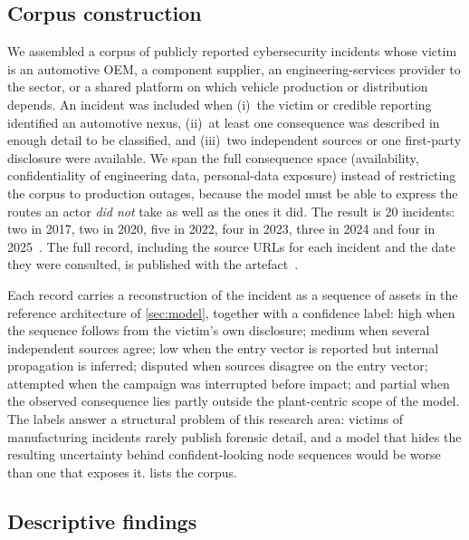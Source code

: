 \subsection{Corpus construction}

We assembled a corpus of publicly reported cybersecurity incidents whose victim
is an automotive OEM, a component supplier, an engineering-services provider to
the sector, or a shared platform on which vehicle production or distribution
depends. An incident was included when (i)~the victim or credible reporting
identified an automotive nexus, (ii)~at least one consequence was described in
enough detail to be classified, and (iii)~two independent sources or one
first-party disclosure were available. We span the full consequence
space (availability, confidentiality of engineering data, personal-data
exposure) instead of restricting the corpus to production outages, because the model must be able to express the routes an actor
\emph{did not} take as well as the ones it did. The result is 20 incidents:
two in 2017, two in 2020, five in 2022, four in 2023, three in 2024 and four in
2025~\cite{inc01renault,inc01nbc,inc03honda,inc04toyota,inc04infosec,inc05denso,%
inc06bridgestone,inc07continental,inc08tesla,inc09toyotacloud,inc10vw,inc11cdk,%
inc14yanfeng,inc17stellantis,inc18cmc,inc18cw,inc19toyotagithub,inc20mks}. The
full record, including the source URLs for each incident and the date they were
consulted, is published with the artefact~\cite{capmartifact}.

Each record carries a reconstruction of the incident as a sequence of assets in
the reference architecture of \cref{sec:model}, together with a confidence
label: \textsf{high} when the sequence follows from the victim's own
disclosure; \textsf{medium} when several independent sources agree;
\textsf{low} when the entry vector is reported but internal propagation is
inferred; \textsf{disputed} when sources disagree on the entry vector;
\textsf{attempted} when the campaign was interrupted before impact; and
\textsf{partial} when the observed consequence lies partly outside the
plant-centric scope of the model. The labels answer a structural problem of this research area: victims of manufacturing incidents
rarely publish forensic detail, and a model that hides the resulting
uncertainty behind confident-looking node sequences would be worse than one
that exposes it.  lists the corpus.



\subsection{Descriptive findings}

